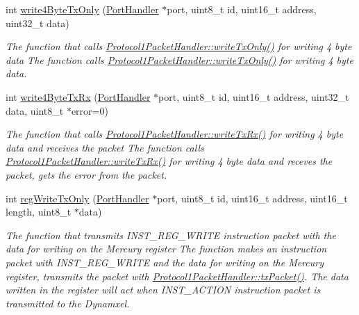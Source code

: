 \begin{DoxyCompactItemize}
int \hyperlink{classmercury_1_1_protocol1_packet_handler_a78004a3d9ddb84d920b8013d23b45299}{write4\+Byte\+Tx\+Only} (\hyperlink{classmercury_1_1_port_handler}{Port\+Handler} $\ast$port, uint8\+\_\+t id, uint16\+\_\+t address, uint32\+\_\+t data)
\begin{DoxyCompactList}\small\item\em The function that calls \hyperlink{classmercury_1_1_protocol1_packet_handler_a4dac18c7624bef8723b1e96889bce665}{Protocol1\+Packet\+Handler\+::write\+Tx\+Only()} for writing 4 byte data  The function calls \hyperlink{classmercury_1_1_protocol1_packet_handler_a4dac18c7624bef8723b1e96889bce665}{Protocol1\+Packet\+Handler\+::write\+Tx\+Only()} for writing 4 byte data. \end{DoxyCompactList}\item 
int \hyperlink{classmercury_1_1_protocol1_packet_handler_a8227ed06ea46d771e796ddfce47beea6}{write4\+Byte\+Tx\+Rx} (\hyperlink{classmercury_1_1_port_handler}{Port\+Handler} $\ast$port, uint8\+\_\+t id, uint16\+\_\+t address, uint32\+\_\+t data, uint8\+\_\+t $\ast$error=0)
\begin{DoxyCompactList}\small\item\em The function that calls \hyperlink{classmercury_1_1_protocol1_packet_handler_abbeadd6883c895cb8f9f9497c27d8a94}{Protocol1\+Packet\+Handler\+::write\+Tx\+Rx()} for writing 4 byte data and receives the packet  The function calls \hyperlink{classmercury_1_1_protocol1_packet_handler_abbeadd6883c895cb8f9f9497c27d8a94}{Protocol1\+Packet\+Handler\+::write\+Tx\+Rx()} for writing 4 byte data and receves the packet,  gets the error from the packet. \end{DoxyCompactList}\item 
int \hyperlink{classmercury_1_1_protocol1_packet_handler_a2307c9edac7cef2637f82103c0923075}{reg\+Write\+Tx\+Only} (\hyperlink{classmercury_1_1_port_handler}{Port\+Handler} $\ast$port, uint8\+\_\+t id, uint16\+\_\+t address, uint16\+\_\+t length, uint8\+\_\+t $\ast$data)
\begin{DoxyCompactList}\small\item\em The function that transmits I\+N\+S\+T\+\_\+\+R\+E\+G\+\_\+\+W\+R\+I\+TE instruction packet with the data for writing on the Mercury register  The function makes an instruction packet with I\+N\+S\+T\+\_\+\+R\+E\+G\+\_\+\+W\+R\+I\+TE and the data for writing on the Mercury register,  transmits the packet with \hyperlink{classmercury_1_1_protocol1_packet_handler_a232c9159fef54e7aaf38859fcce5a322}{Protocol1\+Packet\+Handler\+::tx\+Packet()}.  The data written in the register will act when I\+N\+S\+T\+\_\+\+A\+C\+T\+I\+ON instruction packet is transmitted to the Dynamxel. \end{DoxyCompactList}\item 

\end{DoxyCompactItemize}
